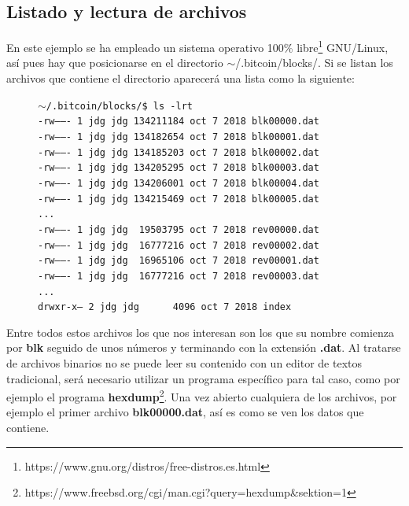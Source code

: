 \documentclass{article}
\begin{document}
    \subsection{Listado y lectura de archivos}
    En este ejemplo se ha empleado un sistema operativo 100\% libre\footnote{https://www.gnu.org/distros/free-distros.es.html} GNU/Linux, así pues hay que posicionarse en el directorio $\sim$/.bitcoin/blocks/. Si se listan los archivos que contiene el directorio aparecerá una lista como la siguiente:
    
    \begin{figure}[H]
    \scriptsize{\texttt{$\sim$/.bitcoin/blocks/\$ ls -lrt \\
-rw------- 1 jdg jdg 134211184 oct  7  2018 blk00000.dat \\
-rw------- 1 jdg jdg 134182654 oct  7  2018 blk00001.dat \\
-rw------- 1 jdg jdg 134185203 oct  7  2018 blk00002.dat \\
-rw------- 1 jdg jdg 134205295 oct  7  2018 blk00003.dat \\
-rw------- 1 jdg jdg 134206001 oct  7  2018 blk00004.dat \\
-rw------- 1 jdg jdg 134215469 oct  7  2018 blk00005.dat \\
... \\
-rw------- 1 jdg jdg \ 19503795 oct  7  2018 rev00000.dat \\
-rw------- 1 jdg jdg \ 16777216 oct  7  2018 rev00002.dat \\
-rw------- 1 jdg jdg \ 16965106 oct  7  2018 rev00001.dat \\
-rw------- 1 jdg jdg \ 16777216 oct  7  2018 rev00003.dat \\
... \\
drwxr-x--- 2 jdg jdg \ \ \ \ \ 4096 oct  7 2018 index}
    }
    \end{figure}
    
    Entre todos estos archivos los que nos interesan son los que su nombre comienza por \textbf{blk} seguido de unos números y terminando con la extensión \textbf{.dat}. Al tratarse de archivos binarios no se puede leer su contenido con un editor de textos tradicional, será necesario utilizar un programa específico para tal caso, como por ejemplo el programa \textbf{hexdump}\footnote{https://www.freebsd.org/cgi/man.cgi?query=hexdump\&sektion=1}. Una vez abierto cualquiera de los archivos, por ejemplo el primer archivo \textbf{blk00000.dat}, así es como se ven los datos que contiene.
    
\end{document}
